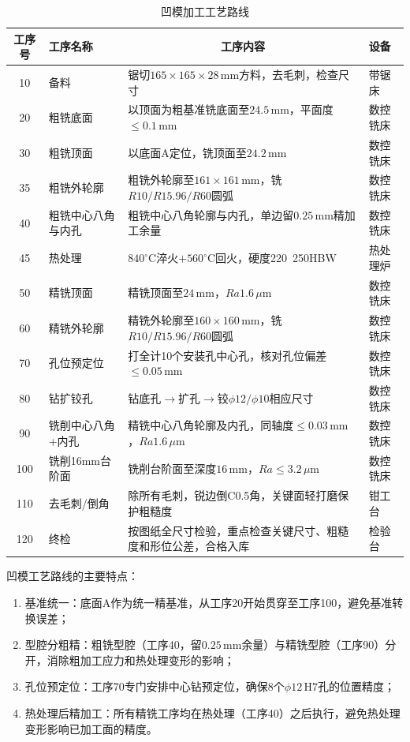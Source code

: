 \documentclass{xautCADreport}
\begin{document}
\begin{table}[H]
  \centering
  \caption{凹模加工工艺路线}
  \label{tab:route_die}
  \small
  \begin{tabular}{clp{7.5cm}l}
    \toprule
    工序号 & 工序名称 & \multicolumn{1}{c}{工序内容} & 设备 \\
    \midrule
    10 & 备料 & 锯切$165\times165\times28\,\mathrm{mm}$方料，去毛刺，检查尺寸 & 带锯床 \\
    20 & 粗铣底面 & 以顶面为粗基准铣底面至$24.5\,\mathrm{mm}$，平面度$\leq0.1\,\mathrm{mm}$ & 数控铣床 \\
    30 & 粗铣顶面 & 以底面A定位，铣顶面至$24.2\,\mathrm{mm}$ & 数控铣床 \\
    35 & 粗铣外轮廓 & 粗铣外轮廓至$161\times161\,\mathrm{mm}$，铣$R10/R15.96/R60$圆弧 & 数控铣床 \\
    40 & 粗铣中心八角与内孔 & 粗铣中心八角轮廓与内孔，单边留$0.25\,\mathrm{mm}$精加工余量 & 数控铣床 \\
    45 & 热处理 & $840^{\circ}\mathrm{C}$淬火$+560^{\circ}\mathrm{C}$回火，硬度220~250HBW & 热处理炉 \\
    50 & 精铣顶面 & 精铣顶面至$24\,\mathrm{mm}$，$Ra1.6\,\mu\mathrm{m}$ & 数控铣床 \\
    60 & 精铣外轮廓 & 精铣外轮廓至$160\times160\,\mathrm{mm}$，铣$R10/R15.96/R60$圆弧 & 数控铣床 \\
    70 & 孔位预定位 & 打全计10个安装孔中心孔，核对孔位偏差$\leq0.05\,\mathrm{mm}$ & 数控铣床 \\
    80 & 钻扩铰孔 & 钻底孔$\to$扩孔$\to$铰$\phi12/\phi10$相应尺寸 & 数控铣床 \\
    90 & 铣削中心八角+内孔 & 精铣中心八角轮廓及内孔，同轴度$\leq0.03\,\mathrm{mm}$，$Ra1.6\,\mu\mathrm{m}$ & 数控铣床 \\
    100 & 铣削16mm台阶面 & 铣削台阶面至深度$16\,\mathrm{mm}$，$Ra\leq3.2\,\mu\mathrm{m}$ & 数控铣床 \\
    110 & 去毛刺/倒角 & 除所有毛刺，锐边倒C0.5角，关键面轻打磨保护粗糙度 & 钳工台 \\
    120 & 终检 & 按图纸全尺寸检验，重点检查关键尺寸、粗糙度和形位公差，合格入库 & 检验台 \\
    \bottomrule
  \end{tabular}
\end{table}

凹模工艺路线的主要特点：
\begin{enumerate}
  \item 基准统一：底面A作为统一精基准，从工序20开始贯穿至工序100，避免基准转换误差；
  \item 型腔分粗精：粗铣型腔（工序40，留$0.25\,\mathrm{mm}$余量）与精铣型腔（工序90）分开，消除粗加工应力和热处理变形的影响；
  \item 孔位预定位：工序70专门安排中心钻预定位，确保8个$\phi12\,\mathrm{H7}$孔的位置精度；
  \item 热处理后精加工：所有精铣工序均在热处理（工序40）之后执行，避免热处理变形影响已加工面的精度。
\end{enumerate}
\end{document}
